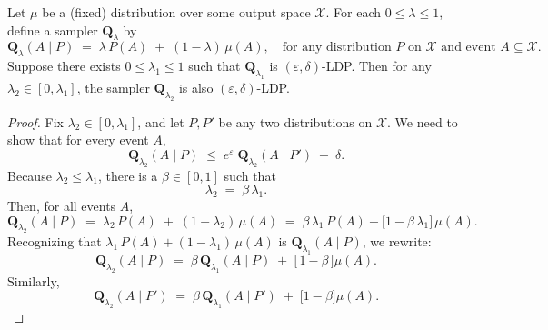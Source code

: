 \documentclass[10pt,a4paper]{amsart}
\newcommand{\bQ}{\mathbf{Q}}
\begin{document}
\begin{lemma}\label{lem:decrease-lambda}
Let $\mu$ be a (fixed) distribution over some output space $\mathcal{X}$. For each $0 \leq \lambda \leq 1$, define a sampler $\bQ_\lambda$ by
\[
  \bQ_\lambda(A \mid P) \;=\; \lambda\,P(A) \;+\; (1-\lambda)\,\mu(A),
  \quad
  \text{for any distribution }P \text{ on } \mathcal{X} \text{ and event } A \subseteq \mathcal{X}.
\]
Suppose there exists $0 \leq \lambda_1 \leq 1$ such that $\bQ_{\lambda_1}$ is $(\varepsilon,\delta)$-LDP. Then for any $\lambda_2 \in [0,\lambda_1]$, the sampler $\bQ_{\lambda_2}$ is also $(\varepsilon,\delta)$-LDP.
\end{lemma}

\begin{proof}
Fix $\lambda_2 \in [0,\lambda_1]$, and let $P,P'$ be any two distributions on $\mathcal{X}$. We need to show that for every event $A$,
\[
  \bQ_{\lambda_2}(A \mid P)
  \;\le\;
  e^\varepsilon\;\bQ_{\lambda_2}(A \mid P')
  \;+\;
  \delta.
\]
Because $\lambda_2 \le \lambda_1$, there is a $\beta \in [0,1]$ such that
\[
  \lambda_2 \;=\;\beta \,\lambda_1.
\]
Then, for all events $A$,
\[
  \bQ_{\lambda_2}(A \mid P)
  \;=\;
  \lambda_2\,P(A) \;+\; (1-\lambda_2)\,\mu(A)
  \;=\;
  \beta\,\lambda_1\,P(A) + \bigl[1 - \beta\,\lambda_1\bigr]\,\mu(A).
\]
Recognizing that $\lambda_1\,P(A) + (1-\lambda_1)\,\mu(A)$ is $\bQ_{\lambda_1}(A \mid P)$, we rewrite:
\[
  \bQ_{\lambda_2}(A \mid P)
  \;=\;
  \beta\,\bQ_{\lambda_1}(A \mid P)
  \;+\;
  \bigl[\,1-\beta\,\bigr]\mu(A).
\]
Similarly,
\[
  \bQ_{\lambda_2}(A \mid P')
  \;=\;
  \beta\,\bQ_{\lambda_1}(A \mid P') \;+\; \bigl[1-\beta\bigr]\mu(A).
\]


\end{proof}
\end{document}
